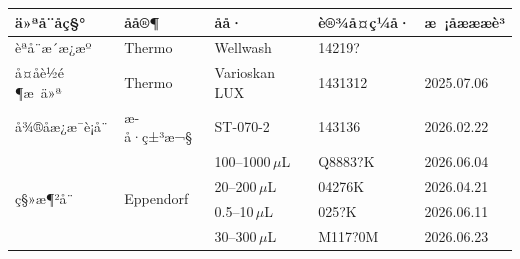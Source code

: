 \documentclass[UTF8,10pt,a4paper,fontset=fandol]{ctexart}
\newcommand{\fieldvalue}[1]{#1}
\newcommand{\handwritten}[1]{#1}
\begin{document}
\begin{tabularx}{\textwidth}{|p{2.7cm}|p{2.5cm}|p{2.5cm}|p{2.5cm}|X|}
\hline
ä»ªå¨åç§° & åå®¶ & åå· & è®¾å¤ç¼å· & æ ¡åæææè³ \\
\hline
èªå¨æ´æ¿æº & Thermo & Wellwash &
\fieldvalue{\handwritten{14219?}} &
\fieldvalue{\handwritten{\checkmark}} \\
\hline
å¤åè½é¶æ ä»ª & Thermo & Varioskan LUX &
\fieldvalue{\handwritten{1431312}} &
\fieldvalue{\handwritten{2025.07.06}} \\
\hline
å¾®å­æ¿æ¯è¡å¨ & æ­å·ç±³æ¬§ & ST-070-2 &
\fieldvalue{\handwritten{143136}} &
\fieldvalue{\handwritten{2026.02.22}} \\
\hline
\multirow{4}{*}{ç§»æ¶²å¨} & \multirow{4}{*}{Eppendorf} &
\fieldvalue{\handwritten{100--1000\,$\mu$L}} &
\fieldvalue{\handwritten{Q8883?K}} &
\fieldvalue{\handwritten{2026.06.04}} \\
\cline{3-5}
& &
\fieldvalue{\handwritten{20--200\,$\mu$L}} &
\fieldvalue{\handwritten{04276K}} &
\fieldvalue{\handwritten{2026.04.21}} \\
\cline{3-5}
& &
\fieldvalue{\handwritten{0.5--10\,$\mu$L}} &
\fieldvalue{\handwritten{025?K}} &
\fieldvalue{\handwritten{2026.06.11}} \\
\cline{3-5}
& &
\fieldvalue{\handwritten{30--300\,$\mu$L}} &
\fieldvalue{\handwritten{M117?0M}} &
\fieldvalue{\handwritten{2026.06.23}} \\
\hline
\end{tabularx}
\end{document}
